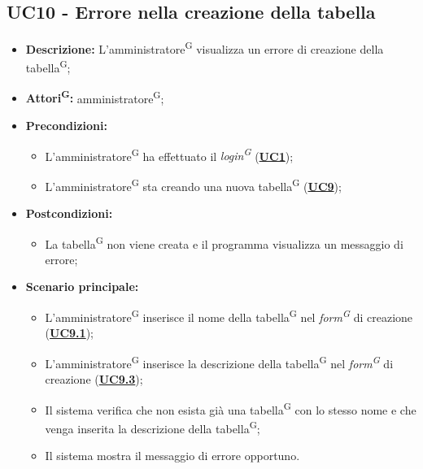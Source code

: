 \subsection{UC10 - Errore nella creazione della tabella}
\label{sec:UC10}
\begin{itemize}
	\item \textbf{Descrizione:} L’amministratore\textsuperscript{G} visualizza un errore di creazione della tabella\textsuperscript{G};
	\item \textbf{Attori\textsuperscript{G}:} amministratore\textsuperscript{G};
	\item \textbf{Precondizioni:} 
	\begin{itemize}
		\item L’amministratore\textsuperscript{G} ha effettuato il \textit{login\textsuperscript{G}} (\hyperref[sec:UC1]{\textbf{UC1}});
		\item L’amministratore\textsuperscript{G} sta creando una nuova tabella\textsuperscript{G} (\hyperref[sec:UC9]{\textbf{UC9}});
	\end{itemize}
	\item \textbf{Postcondizioni:} 
	\begin{itemize}
		\item La tabella\textsuperscript{G} non viene creata e il programma visualizza un messaggio di errore;
	\end{itemize}
	\item \textbf{Scenario principale:} 
	\begin{itemize}
		\item L’amministratore\textsuperscript{G} inserisce il nome della tabella\textsuperscript{G} nel \textit{form\textsuperscript{G}} di creazione (\hyperref[sec:UC9.1]{\textbf{UC9.1}});
		\item L’amministratore\textsuperscript{G} inserisce la descrizione della tabella\textsuperscript{G} nel \textit{form\textsuperscript{G}} di creazione (\hyperref[sec:UC9.3]{\textbf{UC9.3}});
		\item Il sistema verifica che non esista già una tabella\textsuperscript{G} con lo stesso nome e che venga inserita la descrizione della tabella\textsuperscript{G};
		\item Il sistema mostra il messaggio di errore opportuno.
	\end{itemize}
\end{itemize}

